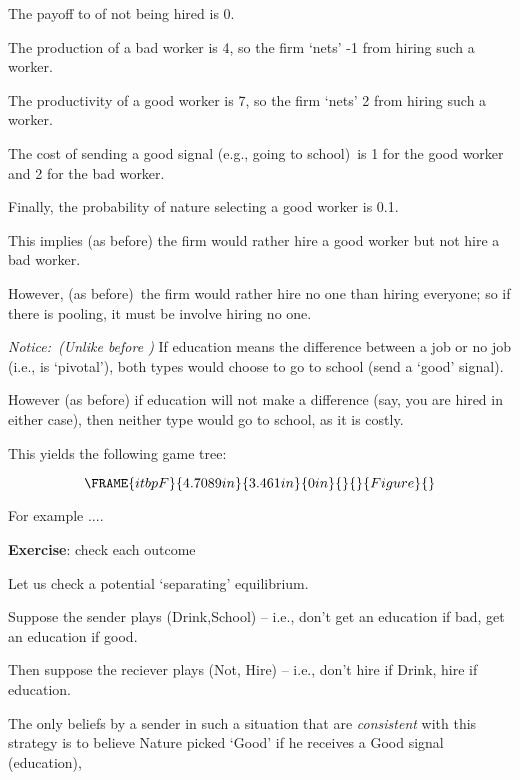\documentclass{article}
\begin{document}
The payoff to of not being hired is $0.$

The production of a bad worker is 4, so the firm `nets' -1 from hiring such
a worker.

The productivity of a good worker is 7, so the firm `nets' 2 from hiring
such a worker.

The cost of sending a good signal (e.g., going to school)\ is 1 for the good
worker and 2 for the bad worker.

\bigskip

Finally, the probability of nature selecting a good worker is 0.1. \ 

This implies (as before) the firm would rather hire a good worker but not
hire a bad worker.

However, (as before)\ the firm would rather hire no one than hiring
everyone; so if there is pooling, it must be involve hiring no one.

\bigskip

\textit{Notice:\ (Unlike before ) }If education means the difference between
a job or no job (i.e., is `pivotal'), both types would choose to go to
school (send a `good' signal).

However (as before) if education will not make a difference (say, you are
hired in either case), then neither type would go to school, as it is costly.

This yields the following game tree:

\[
\FRAME{itbpF}{4.7089in}{3.461in}{0in}{}{}{Figure}{\special{language
"Scientific Word";type "GRAPHIC";maintain-aspect-ratio TRUE;display
"USEDEF";valid_file "T";width 4.7089in;height 3.461in;depth
0in;original-width 10.3855in;original-height 7.625in;cropleft "0";croptop
"1";cropright "1";cropbottom "0";tempfilename
'JSY50W0M.wmf';tempfile-properties "XPR";}}
\]

For example ....

\textbf{Exercise}: check each outcome

\bigskip

Let us check a potential `separating' equilibrium.

Suppose the sender plays (Drink,School) -- i.e., don't get an education if
bad, get an education if good.

Then suppose the reciever plays (Not, Hire) -- i.e., don't hire if Drink,
hire if education.

\bigskip

The only beliefs by a sender in such a situation that are \textit{consistent}
with this strategy is to believe Nature picked `Good' if he receives a Good
signal (education),
\end{document}
